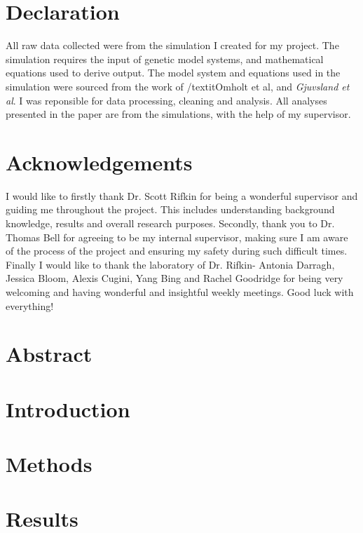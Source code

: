 \documentclass[11pt]{article}
\begin{document}


\newpage

\section{Declaration}
All raw data collected were from the simulation I created for my project. The simulation requires the input of genetic model systems, and mathematical equations used to derive output. The model system and equations used in the simulation were sourced from the work of /textit{Omholt et al,} and \textit{Gjuvsland et al}. I was reponsible for data processing, cleaning and analysis. All analyses presented in the paper are from the simulations, with the help of my supervisor.

\section{Acknowledgements}
I would like to firstly thank Dr. Scott Rifkin for being a wonderful supervisor and guiding me throughout the project. This includes understanding background knowledge, results and overall research purposes. Secondly, thank you to Dr. Thomas Bell for agreeing to be my internal supervisor, making sure I am aware of the process of the project and ensuring my safety during such difficult times.
\\Finally I would like to thank the laboratory of Dr. Rifkin- Antonia Darragh, Jessica Bloom, Alexis Cugini, Yang Bing and Rachel Goodridge for being very welcoming and having wonderful and insightful weekly meetings. Good luck with everything!

\newpage

\section{Abstract}

\newpage

\section{Introduction}


\section{Methods}


\section{Results}
\end{document}

